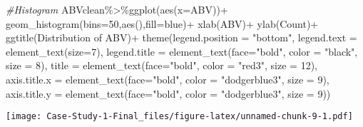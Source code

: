 \documentclass[
]{article}
\newenvironment{Shaded}{\begin{snugshade}}{\end{snugshade}}
\newcommand{\AttributeTok}[1]{\textcolor[rgb]{0.77,0.63,0.00}{#1}}
\newcommand{\CommentTok}[1]{\textcolor[rgb]{0.56,0.35,0.01}{\textit{#1}}}
\newcommand{\DecValTok}[1]{\textcolor[rgb]{0.00,0.00,0.81}{#1}}
\newcommand{\FunctionTok}[1]{\textcolor[rgb]{0.00,0.00,0.00}{#1}}
\newcommand{\NormalTok}[1]{#1}
\newcommand{\SpecialCharTok}[1]{\textcolor[rgb]{0.00,0.00,0.00}{#1}}
\newcommand{\StringTok}[1]{\textcolor[rgb]{0.31,0.60,0.02}{#1}}
\begin{document}
\begin{Shaded}
\begin{Highlighting}[]
\CommentTok{\#Histogram}
\NormalTok{ABVclean}\SpecialCharTok{\%\textgreater{}\%}\FunctionTok{ggplot}\NormalTok{(}\FunctionTok{aes}\NormalTok{(}\AttributeTok{x=}\NormalTok{ABV))}\SpecialCharTok{+} 
  \FunctionTok{geom\_histogram}\NormalTok{(}\AttributeTok{bins=}\DecValTok{50}\NormalTok{,}\FunctionTok{aes}\NormalTok{(),}\AttributeTok{fill=}\StringTok{\textquotesingle{}blue\textquotesingle{}}\NormalTok{)}\SpecialCharTok{+}
  \FunctionTok{xlab}\NormalTok{(}\StringTok{\textquotesingle{}ABV\textquotesingle{}}\NormalTok{)}\SpecialCharTok{+}
  \FunctionTok{ylab}\NormalTok{(}\StringTok{\textquotesingle{}Count\textquotesingle{}}\NormalTok{)}\SpecialCharTok{+}
  \FunctionTok{ggtitle}\NormalTok{(}\StringTok{\textquotesingle{}Distribution of ABV\textquotesingle{}}\NormalTok{)}\SpecialCharTok{+}
  \FunctionTok{theme}\NormalTok{(}\AttributeTok{legend.position =} \StringTok{"bottom"}\NormalTok{,}
        \AttributeTok{legend.text =} \FunctionTok{element\_text}\NormalTok{(}\AttributeTok{size=}\DecValTok{7}\NormalTok{),}
        \AttributeTok{legend.title =} \FunctionTok{element\_text}\NormalTok{(}\AttributeTok{face=}\StringTok{"bold"}\NormalTok{, }\AttributeTok{color =} \StringTok{"black"}\NormalTok{, }\AttributeTok{size =} \DecValTok{8}\NormalTok{),}
        \AttributeTok{title =} \FunctionTok{element\_text}\NormalTok{(}\AttributeTok{face=}\StringTok{"bold"}\NormalTok{, }\AttributeTok{color =} \StringTok{"red3"}\NormalTok{, }\AttributeTok{size =} \DecValTok{12}\NormalTok{),}
        \AttributeTok{axis.title.x =} \FunctionTok{element\_text}\NormalTok{(}\AttributeTok{face=}\StringTok{"bold"}\NormalTok{, }\AttributeTok{color =} \StringTok{"dodgerblue3"}\NormalTok{, }\AttributeTok{size =} \DecValTok{9}\NormalTok{),}
        \AttributeTok{axis.title.y =} \FunctionTok{element\_text}\NormalTok{(}\AttributeTok{face=}\StringTok{"bold"}\NormalTok{, }\AttributeTok{color =} \StringTok{"dodgerblue3"}\NormalTok{, }\AttributeTok{size =} \DecValTok{9}\NormalTok{))}
\end{Highlighting}
\end{Shaded}

\texttt{[image: Case-Study-1-Final\_files/figure-latex/unnamed-chunk-9-1.pdf]}
\end{document}
